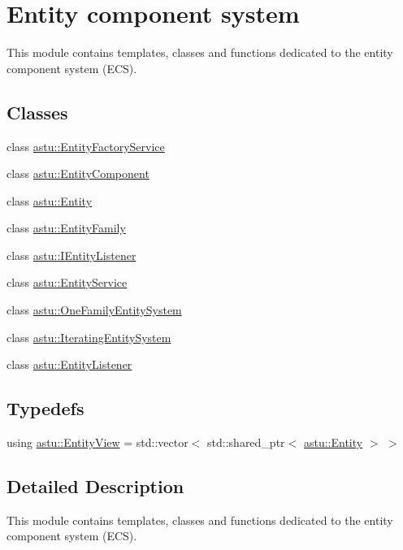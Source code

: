 \hypertarget{group__ecs__group}{}\section{Entity component system}
\label{group__ecs__group}


This module contains templates, classes and functions dedicated to the entity component system (E\+CS).  


\subsection*{Classes}
\begin{DoxyCompactItemize}
\item 
class \hyperlink{classastu_1_1EntityFactoryService}{astu\+::\+Entity\+Factory\+Service}
\item 
class \hyperlink{classastu_1_1EntityComponent}{astu\+::\+Entity\+Component}
\item 
class \hyperlink{classastu_1_1Entity}{astu\+::\+Entity}
\item 
class \hyperlink{classastu_1_1EntityFamily}{astu\+::\+Entity\+Family}
\item 
class \hyperlink{classastu_1_1IEntityListener}{astu\+::\+I\+Entity\+Listener}
\item 
class \hyperlink{classastu_1_1EntityService}{astu\+::\+Entity\+Service}
\item 
class \hyperlink{classastu_1_1OneFamilyEntitySystem}{astu\+::\+One\+Family\+Entity\+System}
\item 
class \hyperlink{classastu_1_1IteratingEntitySystem}{astu\+::\+Iterating\+Entity\+System}
\item 
class \hyperlink{classastu_1_1EntityListener}{astu\+::\+Entity\+Listener}
\end{DoxyCompactItemize}
\subsection*{Typedefs}
\begin{DoxyCompactItemize}
\item 
using \hyperlink{group__ecs__group_gace2fb790b86c3908a65e4222f7ac2f4e}{astu\+::\+Entity\+View} = std\+::vector$<$ std\+::shared\+\_\+ptr$<$ \hyperlink{classastu_1_1Entity}{astu\+::\+Entity} $>$ $>$
\end{DoxyCompactItemize}


\subsection{Detailed Description}
This module contains templates, classes and functions dedicated to the entity component system (E\+CS). 



